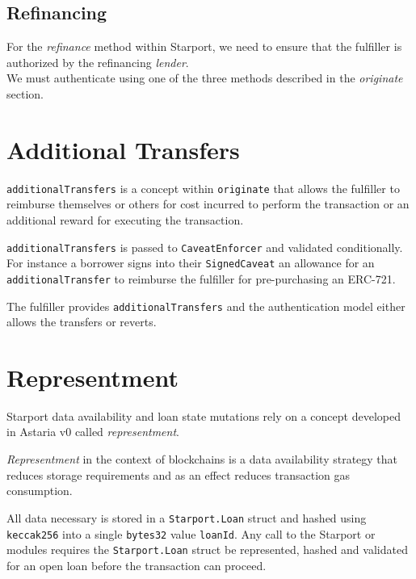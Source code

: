 \documentclass[12pt]{article}
\begin{document}
\subsection{Refinancing}
For the \emph{refinance} method within Starport, we need to ensure that the fulfiller is authorized by the refinancing \emph{lender}.\\

We must authenticate using one of the three methods described in the \emph{originate} section.

\section{Additional Transfers}
\texttt{additionalTransfers} is a concept within \texttt{originate} that allows the fulfiller to reimburse themselves or others for cost incurred to perform the transaction or an additional reward for executing the transaction.

\texttt{additionalTransfers} is passed to \texttt{CaveatEnforcer} and validated conditionally. For instance a borrower signs into their \texttt{SignedCaveat} an allowance for an \texttt{additionalTransfer} to reimburse the fulfiller for pre-purchasing an ERC-721.

The fulfiller provides \texttt{additionalTransfers} and the authentication model either allows the transfers or reverts.

\section{Representment}
Starport data availability and loan state mutations rely on a concept developed in Astaria v0 called \emph{representment}.

\emph{Representment} in the context of blockchains is a data availability strategy that reduces storage requirements and as an effect reduces transaction gas consumption.

All data necessary is stored in a \texttt{Starport.Loan} struct and hashed using \texttt{keccak256} into a single \texttt{bytes32} value \texttt{loanId}. Any call to the Starport or modules requires the \texttt{Starport.Loan} struct be represented, hashed and validated for an open loan before the transaction can proceed.
\end{document}
